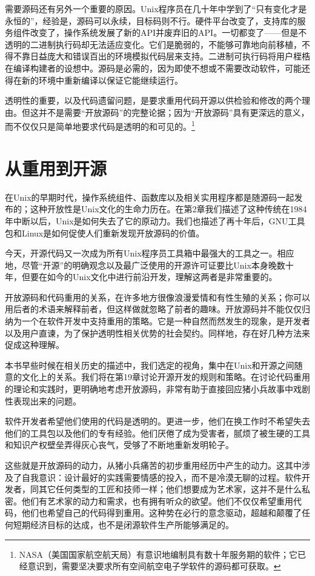 \documentclass[12pt,oneside]{book}
\begin{document}
需要源码还有另外一个重要的原因。Unix程序员在几十年中学到了“只有变化才是永恒的”，经验是，源码可以永续，目标码则不行。硬件平台改变了，支持库的服务组件改变了，操作系统发展了新的API并废弃旧的API。一切都变了——但是不透明的二进制执行码却无法适应变化。它们是脆弱的，不能够可靠地向前移植，不得不靠日益庞大和错误百出的环境模拟代码层来支持。二进制可执行码将用户桎梏在编译构建者的设想中。源码是必需的，因为即使不想或不需要改动软件，可能还得在新的环境中重新编译以保证它能继续运行。

透明性的重要，以及代码遗留问题，是要求重用代码开源以供检验和修改的两个理由。但这并不是需要“开放源码”的完整论据；因为“开放源码”具有更深远的意义，而不仅仅只是简单地要求代码是透明的和可见的。\footnote{NASA（美国国家航空航天局）有意识地编制具有数十年服务期的软件；它已经意识到，需要坚决要求所有空间航空电子学软件的源码都可获取。}


\section{从重用到开源}
在Unix的早期时代，操作系统组件、函数库以及相关实用程序都是随源码一起发布的；这种开放性是Unix文化的生命力历在。在第2章我们描述了这种传统在1984年中断以后，Unix是如何失去了它的原动力。我们也描述了再十年后，GNU工具包和Linux是如何促使人们重新发现开放源码的价值。

今天，开源代码又一次成为所有Unix程序员工具箱中最强大的工具之一。相应地，尽管“开源”的明确观念以及最广泛使用的开源许可证要比Unix本身晚数十年，但要在如今的Unix文化中进行前沿开发，理解这两者是非常重要的。

开放源码和代码重用的关系，在许多地方很像浪漫爱情和有性生殖的关系；你可以用后者的术语来解释前者，但这样做就忽略了前者的趣味。开放源码并不能仅仅归纳为一个在软件开发中支持重用的策略。它是一种自然而然发生的现象，是开发者以及用户直谏，为了保护透明性相关优势的社会契约。同样地，存在好几种方法来促成这种理解。

本书早些时候在相关历史的描述中，我们选定的视角，集中在Unix和开源之间随意的文化上的关系。我们将在第19章讨论开源开发的规则和策略。在讨论代码重用的理论和实践时，更明确地考虑开放源码，非常有助于直接回应猪小兵故事中戏剧性表现出来的问题。

软件开发者希望他们使用的代码是透明的。更进一步，他们在换工作时不希望失去他们的工具包以及他们的专有经验。他们厌倦了成为受害者，腻烦了被生硬的工具和知识产权壁垒弄得灰心丧气，受够了不断地重新发明轮子。

这些就是开放源码的动力，从猪小兵痛苦的初步重用经历中产生的动力。这其中涉及了自我意识：设计最好的实践需要情感的投入，而不是冷漠无聊的过程。软件开发者，同其它任何类型的工匠和技师一样；他们想要成为艺术家，这并不是什么私密。他们有艺术家的动力和需求，也有拥有听众的欲望。他们不仅仅希望重用代码，他们也希望自己的代码得到重用。这种势在必行的意念驱动，超越和颠覆了任何短期经济目标的达成，也不是闭源软件生产所能够满足的。
\end{document}
